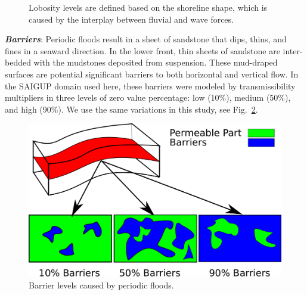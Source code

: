  
\begin{figure}[tbp]%
  
   \hspace{0.5cm}
  \hspace{0.5cm}

  \caption{Lobosity levels are defined based on the shoreline shape, which is caused by the interplay between fluvial and wave forces.}
 \label{fig:lobCauses}
\end{figure}

\textbf{\textit{Barriers}}: 
Periodic floods result in a sheet of sandstone that dips, thins, and fines in a seaward
direction. In the lower front, thin sheets of sandstone are inter-bedded with the mudstones
deposited from suspension. These mud-draped surfaces are potential significant barriers to
both horizontal and vertical flow.  In the SAIGUP domain used here, these barriers were modeled by
transmissibility multipliers in three levels of zero value percentage: low (10\%), medium
(50\%), and high (90\%). We use the same variations in this study, see Fig.~\ref{fig:barriers}.


\begin{figure}[thb]
  \centering
  \includegraphics[width=0.65 \linewidth]{./figurer/barrier} 
  \caption{Barrier levels caused by periodic floods.}
  \label{fig:barriers}
%
\end{figure}

